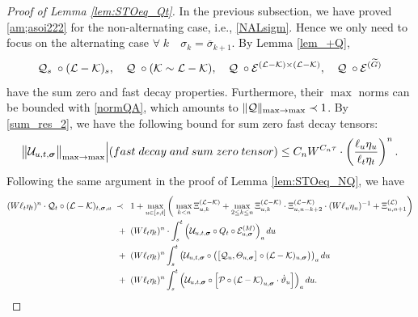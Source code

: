 \documentclass[10pt,reqno]{article}
\theoremstyle{plain} %
\theoremstyle{remark}
\numberwithin{equation}{section}
\begin{document}
\begin{proof}[Proof of Lemma \ref{lem:STOeq_Qt}]
In the previous subsection, we have proved \eqref{am;asoi222} for the non-alternating case, i.e., \eqref{NALsigm}. Hence we only need to focus on the alternating case 
$
\forall \; k \quad \sigma_k=\overline \sigma_{k+1} $.
By Lemma \ref{lem_+Q},  %
$$
{\cal Q}_s\;\circ ({\cal  L-K})_s,\quad {\cal Q}\;\circ ({\cal K\sim L-K}),\quad {\cal Q}\;\circ{\cal E}^{\cal (L-K)\times (L-K)}, \quad {\cal Q}\;\circ {\cal E}^{(\widetilde G)} 
$$  
have
the sum zero and  fast decay properties. Furthermore, their $\max$ norms can be bounded with \eqref{normQA}, which amounts to  
$
\|{\cal Q}\|_{\max\to \max}\prec 1$.
By %
\eqref{sum_res_2},    we have the following bound for  sum zero fast decay tensors: 
\begin{align}\label{jsaudyfa}
    \big\|{\cal U}_{u,t,\boldsymbol{\sigma}}\big\|_{\max\to \max}\Big |({\rm fast\; decay \;and \; sum \; zero\;tensor})\le C_n W^{C_n \tau} \cdot\left(\frac{\ell_u \eta_u}{\ell_t \eta_t}\right)^n.
\end{align}
Following the same argument in the proof of Lemma \ref{lem:STOeq_NQ}, we have 
  \begin{align}\label{sahwmis}
  (W\ell_t\eta_t)^n\cdot  {\cal Q}_t\circ   (\mathcal{L} - \mathcal{K})_{t, \boldsymbol{\sigma}, \textbf{a}} \;\prec\; \; &
  \; 1+\max_{u\in [s,t]}
  \left(\; \max_{k<n }\Xi^{({\cal L-\cal K})}_{u,k}+\max_{2\le k\le n }\Xi^{({\cal L-\cal K})}_{u,k}\cdot \Xi^{({\cal L-\cal K})}_{u,n-k+2}\cdot(W\ell_u\eta_u)^{-1}+\Xi^{({\cal L})}_{u,n+1}\right)
  \nonumber \\
 \; + \; & \;(W\ell_t\eta_t)^n\cdot\int_{s}^t \left(\mathcal{U}_{u, t, \boldsymbol{\sigma}} \circ   Q_t\circ  \mathcal{E}^{(M)}_{u, \boldsymbol{\sigma}}\right)_{\textbf{a}} du 
   \nonumber \\ 
     \; + \; &\; (W\ell_t\eta_t)^n\int_{s}^t 
     \left(\mathcal{U}_{u, t, \boldsymbol{\sigma}} 
     \circ \left( \big[{\cal Q}_u , \varTheta_{u,\boldsymbol{\sigma}} \big]\circ (\mathcal{L} - \mathcal{K}) _{u, \boldsymbol{\sigma} }\right) \right)_{\textbf{a}} du
        \\\nonumber
 \; + \; &\;(W\ell_t\eta_t)^n\int_{s}^t 
     \left(\mathcal{U}_{u, t, \boldsymbol{\sigma}} 
     \circ \left[ {\cal P} \circ
      \left(\mathcal{L} - \mathcal{K}\right)_{u, \boldsymbol{\sigma}}
        \cdot \dot \vartheta_{u } \right]\right)_{\textbf{a}} du.
 \end{align}


\end{proof}
\end{document}
